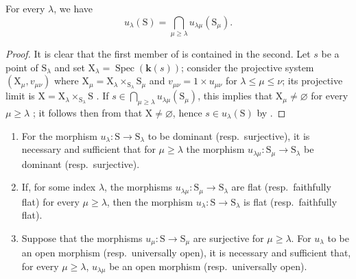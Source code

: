 \begin{corollary}[8.3.7]
\label{IV.8.3.7}
For every $\lambda$, we have
\begin{equation}
  u_\lambda(\mathrm{S})=\bigcap_{\mu\geqslant\lambda}u_{\lambda\mu}(\mathrm{S}_\mu).
  \tag{8.3.7.1}
\label{IV.8.3.7.1}
\end{equation}
\end{corollary}

\begin{proof}
It is clear that the first member of  is contained in the second.
Let $s$ be a point of $\mathrm{S}_\lambda$ and set $\mathrm{X}_\lambda=\operatorname{Spec}(\boldsymbol{k}(s))$; consider the projective system $(\mathrm{X}_\mu,v_{\mu\nu})$ where $\mathrm{X}_\mu=\mathrm{X}_\lambda\times_{\mathrm{S}_\lambda}\mathrm{S}_\mu$ and $v_{\mu\nu}=1\times u_{\mu\nu}$ for $\lambda\leqslant\mu\leqslant\nu$; its projective limit is $\mathrm{X}=\mathrm{X}_\lambda\times_{\mathrm{S}_\lambda}\mathrm{S}$ .
If $s\in\bigcap_{\mu\geqslant\lambda}u_{\lambda\mu}(\mathrm{S}_\mu)$, this implies that $\mathrm{X}_\mu\neq\varnothing$ for every $\mu\geqslant\lambda$ ; it follows then from  that $\mathrm{X}\neq\varnothing$, hence $s\in u_\lambda(\mathrm{S})$ by .
\end{proof}

\begin{proposition}[8.3.8]
\label{IV.8.3.8}
\begin{enumerate}[label=(\roman*)]
  \item For the morphism $u_\lambda:\mathrm{S}\to\mathrm{S}_\lambda$ to be dominant (resp.\ surjective), it is necessary and sufficient that for $\mu\geqslant\lambda$ the morphism $u_{\lambda\mu}:\mathrm{S}_\mu\to\mathrm{S}_\lambda$ be dominant (resp.\ surjective).
  \item If, for some index $\lambda$, the morphisms $u_{\lambda\mu}:\mathrm{S}_\mu\to\mathrm{S}_\lambda$ are flat (resp.\ faithfully flat) for every $\mu\geqslant\lambda$, then the morphism $u_\lambda:\mathrm{S}\to\mathrm{S}_\lambda$ is flat (resp.\ faithfully flat).
  \item Suppose that the morphisms $u_\mu:\mathrm{S}\to\mathrm{S}_\mu$ are surjective for $\mu\geqslant\lambda$.
For $u_\lambda$ to be an open morphism (resp.\ universally open), it is necessary and sufficient that, for every $\mu\geqslant\lambda$, $u_{\lambda\mu}$ be an open morphism (resp.\ universally open).
\end{enumerate}
\end{proposition}

